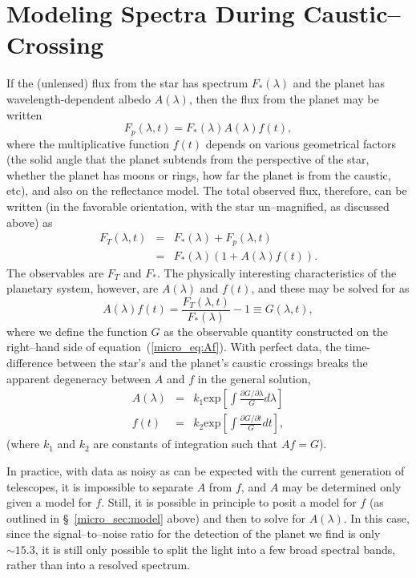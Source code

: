 \section{Modeling Spectra During Caustic--Crossing}
\label{micro_sec:specres}
If the (unlensed) flux from the star has spectrum $F_*(\lambda)$ and
the planet has wavelength-dependent albedo $A(\lambda)$, then the flux
from the planet may be written
%
\begin{equation}
\label{micro_eq:Fp}
F_p(\lambda,t) = F_*(\lambda) A(\lambda) f(t),
\end{equation}
%
where the multiplicative function $f(t)$ depends on various
geometrical factors (the solid angle that the planet subtends from the
perspective of the star, whether the planet has moons or rings, how
far the planet is from the caustic, etc), and also on the reflectance
model.  The total observed flux, therefore, can be written (in the
favorable orientation, with the star un--magnified, as discussed
above) as
%
\begin{eqnarray}
\nonumber F_T(\lambda,t) & = & F_*(\lambda) + F_p(\lambda,t) \\
\label{micro_eq:Ft}
 & = & F_*(\lambda) ( 1 + A(\lambda)f(t) ).
\end{eqnarray}
%
The observables are $F_T$ and $F_*$.  The physically interesting
characteristics of the planetary system, however, are $A(\lambda)$ and
$f(t)$, and these may be solved for as
%
\begin{equation}
\label{micro_eq:Af}
A(\lambda)f(t) = \frac{F_T(\lambda,t)}{F_*(\lambda)} - 1 \equiv G(\lambda,t),
\end{equation}
%
where we define the function $G$ as the observable quantity
constructed on the right--hand side of equation~(\ref{micro_eq:Af}).  With
perfect data, the time-difference between the star's and the planet's
caustic crossings breaks the apparent degeneracy between $A$ and $f$
in the general solution,
\begin{eqnarray}
\label{micro_eq:A}
A(\lambda) & = & k_1 \mbox{exp}\left[\int\frac{\partial G/\partial \lambda}{G}d\lambda\right]\\
f(t) & = & k_2 \mbox{exp}\left[\int\frac{\partial G/\partial t}{G}dt \right],
\end{eqnarray}
(where $k_1$ and $k_2$ are constants of integration such that $Af = G$).

In practice, with data as noisy as can be expected with the current
generation of telescopes, it is impossible to separate $A$ from $f$,
and $A$ may be determined only given a model for $f$.  Still, it is
possible in principle to posit a model for $f$ (as outlined in
\S~\ref{micro_sec:model} above) and then to solve for $A(\lambda)$.  In this
case, since the signal--to--noise ratio for the detection of the
planet we find is only $\sim 15.3$, it is still only possible to split
the light into a few broad spectral bands, rather than into a resolved
spectrum.

